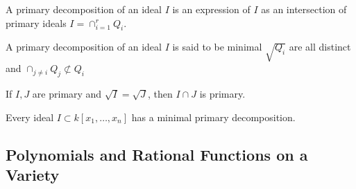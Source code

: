 \documentclass[crop=false,class=article,oneside]{standalone}
\begin{document}
            \begin{definition}
                A primary decomposition of an ideal $I$ is
                an expression of $I$ as an intersection of
                primary ideals $I=\cap_{i=1}^{r} Q_{i}$.
            \end{definition}
            \begin{definition}
                A primary decomposition of an ideal $I$
                is said to be minimal $\sqrt{Q_i}$ are all
                distinct and
                $\cap_{j\ne i}Q_j\not\subset Q_i$
            \end{definition}
            \begin{theorem}
                If $I,J$ are primary and
                $\sqrt{I}=\sqrt{J}$,
                then $I\cap J$ is primary.
            \end{theorem}
            \begin{theorem}
                Every ideal $I \subset k[x_1,\hdots ,x_n]$
                has a minimal primary decomposition.
            \end{theorem}
    \subsection{Polynomials and Rational Functions on a Variety}
\end{document}
